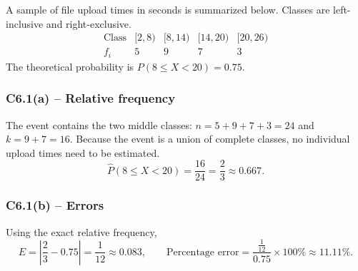 {
A sample of file upload times in seconds is summarized below.
Classes are left-inclusive and right-exclusive.
\[
\begin{array}{c|rrrr}
\text{Class}&[2,8)&[8,14)&[14,20)&[20,26)\\\hline
f_i&5&9&7&3
\end{array}
\]
The theoretical probability is $P(8\le X<20)=0.75$.
\label{sol:c6-1a}
\subsubsection*{C6.1(a) -- Relative frequency }
The event contains the two middle classes:
$n=5+9+7+3=24$ and $k=9+7=16$.
Because the event is a union of complete classes, no individual upload
times need to be estimated.
\[
\widehat P(8\le X<20)=\frac{16}{24}=\frac{2}{3}\approx0.667.
\]
\label{sol:c6-1b}
\subsubsection*{C6.1(b) -- Errors }
Using the exact relative frequency,
\[
E=\left|\frac{2}{3}-0.75\right|=\frac{1}{12}\approx0.083,\qquad
\text{Percentage error}=\frac{\frac{1}{12}}{0.75}\times100\%\approx11.11\%.
\]
\secInicio[sec:c6-1]

}

